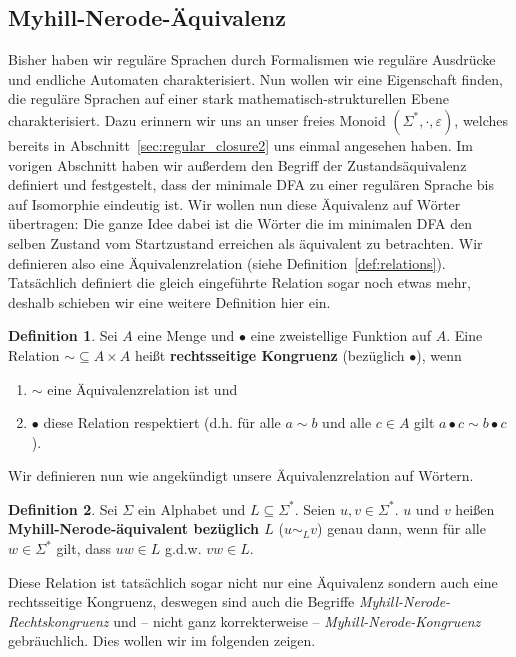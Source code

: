 \documentclass[11pt, a4paper]{article}
\theoremstyle{definition}
\newtheorem{definition}{Definition}[section]
\theoremstyle{plain}
\numberwithin{equation}{section}
\begin{document}
\subsection{Myhill-Nerode-Äquivalenz}\label{sec:regular_myhill-nerode}
Bisher haben wir reguläre Sprachen durch Formalismen wie reguläre Ausdrücke und endliche Automaten charakterisiert. Nun wollen wir eine Eigenschaft finden, die reguläre Sprachen auf einer stark mathematisch-strukturellen Ebene charakterisiert. Dazu erinnern wir uns an unser freies Monoid $(\Sigma^\ast, \cdot, \varepsilon)$, welches bereits in Abschnitt~\ref{sec:regular_closure2} uns einmal angesehen haben. Im vorigen Abschnitt haben wir außerdem den Begriff der Zustandsäquivalenz definiert und festgestelt, dass der minimale DFA zu einer regulären Sprache bis auf Isomorphie eindeutig ist. Wir wollen nun diese Äquivalenz auf Wörter übertragen: Die ganze Idee dabei ist die Wörter die im minimalen DFA den selben Zustand vom Startzustand erreichen als äquivalent zu betrachten. Wir definieren also eine Äquivalenzrelation (siehe Definition~\ref{def:relations}). Tatsächlich definiert die gleich eingeführte Relation sogar noch etwas mehr, deshalb schieben wir eine weitere Definition hier ein.
\begin{definition}
	Sei $A$ eine Menge und $\bullet$ eine zweistellige Funktion auf $A$. Eine Relation $\sim \subseteq A \times A$ heißt \textbf{rechtsseitige Kongruenz} (bezüglich $\bullet$), wenn
	\begin{enumerate}
		\item $\sim$ eine Äquivalenzrelation ist und
		\item $\bullet$ diese Relation respektiert (d.h. für alle $a \sim b$ und alle $c \in A$ gilt $a \bullet c \sim b \bullet c$).
	\end{enumerate}
\end{definition}
Wir definieren nun wie angekündigt unsere Äquivalenzrelation auf Wörtern.
\begin{definition}
	Sei $\Sigma$ ein Alphabet und $L \subseteq \Sigma^\ast$. Seien $u, v \in \Sigma^\ast$. $u$ und $v$ heißen \textbf{Myhill-Nerode-äquivalent bezüglich $L$} ($u \sim_L v$) genau dann, wenn für alle $w \in \Sigma^\ast$ gilt, dass $uw \in L$ g.d.w. $vw \in L$.
\end{definition}
Diese Relation ist tatsächlich sogar nicht nur eine Äquivalenz sondern auch eine rechtsseitige Kongruenz, deswegen sind auch die Begriffe \textit{Myhill-Nerode-Rechtskongruenz} und -- nicht ganz korrekterweise -- \textit{Myhill-Nerode-Kongruenz} gebräuchlich. Dies wollen wir im folgenden zeigen.
\end{document}
